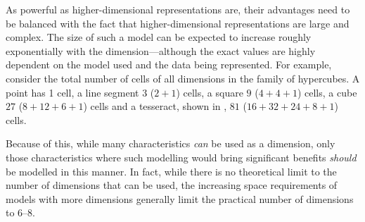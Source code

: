 As powerful as higher-dimensional representations are, their advantages need to be balanced with the fact that higher-dimensional representations are large and complex.
The size of such a model can be expected to increase roughly exponentially with the dimension---although the exact values are highly dependent on the model used and the data being represented.
For example, consider the total number of cells of all dimensions in the family of hypercubes.
A point has 1 cell, a line segment $3$ ($2+1$) cells, a square $9$ ($4+4+1$) cells, a cube $27$ ($8+12+6+1$) cells and a tesseract, shown in , $81$ ($16+32+24+8+1$) cells.

Because of this, while many characteristics \emph{can} be used as a dimension, only those characteristics where such modelling would bring significant benefits \emph{should} be modelled in this manner.
In fact, while there is no theoretical limit to the number of dimensions that can be used, the increasing space requirements of models with more dimensions generally limit the practical number of dimensions to 6--8.

